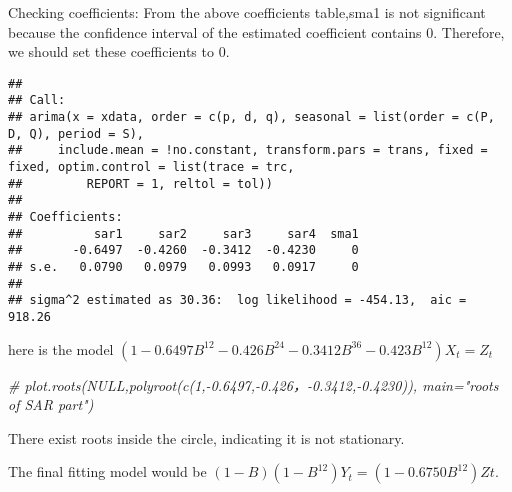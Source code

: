 \documentclass[
]{article}
\newenvironment{Shaded}{\begin{snugshade}}{\end{snugshade}}
\newcommand{\AttributeTok}[1]{\textcolor[rgb]{0.13,0.29,0.53}{#1}}
\newcommand{\CommentTok}[1]{\textcolor[rgb]{0.56,0.35,0.01}{\textit{#1}}}
\newcommand{\ConstantTok}[1]{\textcolor[rgb]{0.56,0.35,0.01}{#1}}
\newcommand{\DecValTok}[1]{\textcolor[rgb]{0.00,0.00,0.81}{#1}}
\newcommand{\FunctionTok}[1]{\textcolor[rgb]{0.13,0.29,0.53}{\textbf{#1}}}
\newcommand{\NormalTok}[1]{#1}
\newcommand{\OtherTok}[1]{\textcolor[rgb]{0.56,0.35,0.01}{#1}}
\newcommand{\SpecialCharTok}[1]{\textcolor[rgb]{0.81,0.36,0.00}{\textbf{#1}}}
\begin{document}
Checking coefficients: From the above coefficients table,sma1 is not
significant because the confidence interval of the estimated coefficient
contains 0. Therefore, we should set these coefficients to 0.

\begin{Shaded}
\end{Shaded}

\begin{verbatim}
## 
## Call:
## arima(x = xdata, order = c(p, d, q), seasonal = list(order = c(P, D, Q), period = S), 
##     include.mean = !no.constant, transform.pars = trans, fixed = fixed, optim.control = list(trace = trc, 
##         REPORT = 1, reltol = tol))
## 
## Coefficients:
##          sar1     sar2     sar3     sar4  sma1
##       -0.6497  -0.4260  -0.3412  -0.4230     0
## s.e.   0.0790   0.0979   0.0993   0.0917     0
## 
## sigma^2 estimated as 30.36:  log likelihood = -454.13,  aic = 918.26
\end{verbatim}

here is the model
\((1-0.6497B^{12}-0.426B^{24}-0.3412B^{36}-0.423B^{12})X_{t}=Z_{t}\)

\begin{Shaded}
\begin{Highlighting}[]
\CommentTok{\# plot.roots(NULL,polyroot(c(1,{-}0.6497,{-}0.426，{-}0.3412,{-}0.4230)), main="roots of SAR part")}
\end{Highlighting}
\end{Shaded}

There exist roots inside the circle, indicating it is not stationary.

The final fitting model would be
\((1 − B)(1 − B^{12})Y_t = (1 − 0.6750B^{12})Zt\).
\end{document}
